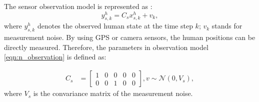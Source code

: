 \documentclass[journal]{IEEEtran}
\begin{document}
	
	
	
	
	The sensor observation model is represented as : 
\begin{equation}
		y_{s,k}^h=C_sx_{s,k}^h+v_k,\label{eqn:n_observation}
	\end{equation}\normalsize
	where $y_{s,k}^h$ denotes the observed human state at the time step $k$; $v_k$ stands for measurement noise. 
    By using GPS or camera sensors, the human positions can be directly measured. 
	Therefore, the parameters in observation model \cref{eqn:n_observation} is defined as:
	\addtocounter{equation}{-1}
   \begin{subequations}
		\begin{align*}
			C_s&=\left[
			\begin{array}{ccccc}
				1& 0& 0& 0& 0\\
				0& 0& 1& 0& 0
			\end{array}\right],
			v\sim\mathcal{N}(0,V_s),
		\end{align*}
	\end{subequations}\normalsize
	where $V_s$ is the convariance matrix of the measurement noise.
    
	
	
\end{document}
